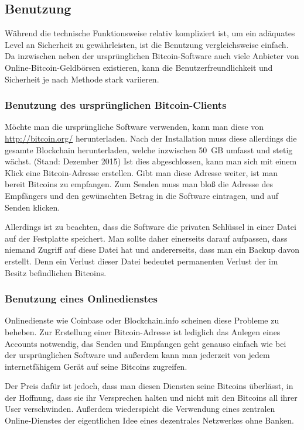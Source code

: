 \subsection{Benutzung}

Während die technische Funktionsweise relativ kompliziert ist, um ein adäquates Level an Sicherheit zu gewährleisten, ist die Benutzung vergleichsweise einfach.
Da inzwischen neben der ursprünglichen Bitcoin-Software auch viele Anbieter von Online-Bitcoin-Geldbörsen existieren, kann die Benutzerfreundlichkeit und Sicherheit je nach Methode stark variieren.

\subsubsection{Benutzung des ursprünglichen Bitcoin-Clients}

Möchte man die ursprüngliche Software verwenden, kann man diese von \url{http://bitcoin.org/} herunterladen.
Nach der Installation muss diese allerdings die gesamte Blockchain herunterladen, welche inzwischen 50~GB umfasst und stetig wächst. (Stand: Dezember 2015)
Ist dies abgeschlossen, kann man sich mit einem Klick eine Bitcoin-Adresse erstellen.
Gibt man diese Adresse weiter, ist man bereit Bitcoins zu empfangen.
Zum Senden muss man bloß die Adresse des Empfängers und den gewünschten Betrag in die Software eintragen, und auf Senden klicken.

Allerdings ist zu beachten, dass die Software die privaten Schlüssel in einer Datei auf der Festplatte speichert.
Man sollte daher einerseits darauf aufpassen, dass niemand Zugriff auf diese Datei hat und andererseits, dass man ein Backup davon erstellt.
Denn ein Verlust dieser Datei bedeutet permanenten Verlust der im Besitz befindlichen Bitcoins.

\subsubsection{Benutzung eines Onlinedienstes}

Onlinedienste wie Coinbase oder Blockchain.info scheinen diese Probleme zu beheben.
Zur Erstellung einer Bitcoin-Adresse ist lediglich das Anlegen eines Accounts notwendig, das Senden und Empfangen geht genauso einfach wie bei der ursprünglichen Software und außerdem kann man jederzeit von jedem internetfähigem Gerät auf seine Bitcoins zugreifen.

Der Preis dafür ist jedoch, dass man diesen Diensten seine Bitcoins überlässt, in der Hoffnung, dass sie ihr Versprechen halten und nicht mit den Bitcoins all ihrer User verschwinden.
Außerdem wiederspicht die Verwendung eines zentralen Online-Dienstes der eigentlichen Idee eines dezentrales Netzwerkes ohne Banken.
